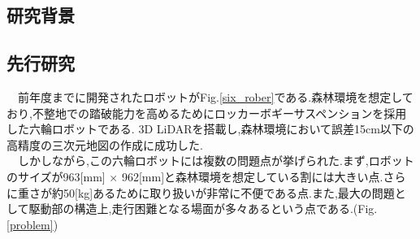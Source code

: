 \subsection{研究背景}
\par 

\subsection{先行研究}
\ \ 前年度までに開発されたロボットがFig.\ref{six_rober}である.森林環境を想定しており,不整地での踏破能力を高めるためにロッカーボギーサスペンションを採用した六輪ロボットである.
3D LiDARを搭載し,森林環境において誤差15cm以下の高精度の三次元地図の作成に成功した.\cite{arita}\\
\ \ しかしながら,この六輪ロボットには複数の問題点が挙げられた.まず,ロボットのサイズが963[mm] $\times$ 962[mm]と森林環境を想定している割には大きい点.さらに重さが約50[kg]あるために取り扱いが非常に不便である点.また,最大の問題として駆動部の構造上,走行困難となる場面が多々あるという点である.(Fig.\ref{problem})


